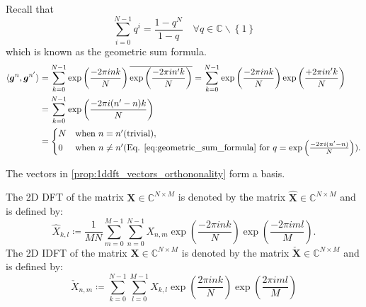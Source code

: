 \begin{Proof}\label{proof:1ddft_vectors_orthononality}
    Recall that
    \begin{equation}\label{eq:geometric_sum_formula}
        \sum_{i=0}^{N-1} q^i = \frac{1-q^N}{1-q} \quad \forall q \in \mathbb{C}\backslash\left\{1\right\}
    \end{equation}
    which is known as the geometric sum formula. 
    \begin{equation}
    \begin{split} 
        \langle\boldsymbol{g}^n,\boldsymbol{g}^{n'}\rangle &= \sum_{k=0}^{N-1} \exp\left({\frac{-2\pi ink}{N}}\right)\overline{\exp\left({\frac{-2\pi in'k}{N}}\right)}
        = \sum_{k=0}^{N-1} \exp\left({\frac{-2\pi ink}{N}}\right)\exp\left({\frac{+2\pi in'k}{N}}\right)\\
        &= \sum_{k=0}^{N-1} \exp\left({\frac{-2\pi i(n'-n)k}{N}}\right)\\
        &=
        \begin{cases}
            N & \text{when $n = n'$}\text{(trivial)},\\
            0 & \text{when $n\neq n'$}\text{(Eq. \ref{eq:geometric_sum_formula} for $q = \exp\left({\frac{-2\pi i(n'-n)}{N}}\right)$)}.
        \end{cases}
    \end{split}
\end{equation}
\end{Proof}

\begin{Prop}
    The vectors in \cref{prop:1ddft_vectors_orthononality} form a basis.
\end{Prop}
\begin{Def}\label{def:2ddft_2didft}
    The 2D \ac{DFT} of the matrix $\boldsymbol{X} \in \mathbb{C}^{N \times M}$ is denoted by 
    the matrix $\hat {\boldsymbol{X}} \in \mathbb{C}^{N \times M}$ and is defined by:
    \begin{equation}\label{eq:2ddft}
        {\hat X}_{k,l} \coloneqq \frac{1}{MN}\sum_{m=0}^{M-1}\sum_{n=0}^{N-1} X_{n,m}\exp\left({\frac{-2\pi ink}{N}}\right)\exp\left({\frac{-2\pi iml}{M}}\right).
    \end{equation}
    The 2D \ac{IDFT} of the matrix $\boldsymbol{X} \in \mathbb{C}^{N \times M}$ is denoted by 
    the matrix $\check {\boldsymbol{X}} \in \mathbb{C}^{N \times M}$ and is defined by:
    \begin{equation}\label{eq:2didft}
        \check X_{n,m} \coloneqq \sum_{k=0}^{N-1}\sum_{l=0}^{M-1}X_{k,l}\exp\left({\frac{2\pi ink}{N}}\right)\exp\left({\frac{2\pi iml}{M}}\right)
    \end{equation}    
\end{Def}

